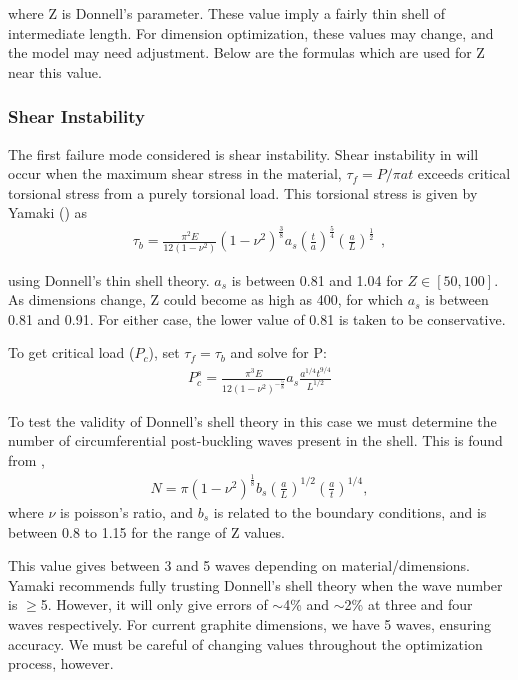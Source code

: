 \documentclass{report}
\begin{document}
where Z is Donnell's parameter. These value imply a fairly thin shell of intermediate length. For dimension optimization, these values may change, and the model may need adjustment. Below are the formulas which are used for Z near this value.

\subsubsection{Shear Instability}

The first failure mode considered is shear instability. Shear instability in will occur when the maximum shear stress in the material, $\tau_{f} = P/\pi at$ exceeds critical torsional stress from a purely torsional load. This torsional stress is given by Yamaki (\cite{Yamaki1984}) as
\begin{eqnarray}
\tau_{b} = \frac{\pi^2E}{12(1-\nu^2)}(1-\nu^2)^{\frac{3}{8}}a_s\left(\frac{t}{a}\right)^{\frac{5}{4}}\left(\frac{a}{L}\right)^{\frac{1}{2}}~~,
\end{eqnarray}

using Donnell's thin shell theory. $a_{s}$ is between 0.81 and 1.04 for $Z \in [50,100]$. As dimensions change, Z could become as high as 400, for which $a_{s}$ is between 0.81 and 0.91. For either case, the lower value of 0.81 is taken to be conservative.

To get critical load ($P_{c}$), set $\tau_{f} = \tau_{b}$ and solve for P:
\begin{eqnarray}
P_{c}^{s} = \frac{\pi^3E}{12(1-\nu^2)^{-\frac{5}{8}}}a_{s}\frac{a^{1/4}t^{9/4}}{L^{1/2}}
\end{eqnarray}

To test the validity of Donnell's shell theory in this case we must determine the number of circumferential post-buckling waves present in the shell. This is found from \cite{Yamaki1984},
\begin{eqnarray}
N = \pi(1-\nu^2)^{\frac{1}{8}}b_{s}\left(\frac{a}{L}\right)^{1/2}\left(\frac{a}{t}\right)^{1/4},
\end{eqnarray}
where $\nu$ is poisson's ratio, and $b_{s}$ is related to the boundary conditions, and is between 0.8 to 1.15 for the range of Z values.

This value gives between 3 and 5 waves depending on material/dimensions. Yamaki recommends fully trusting Donnell's shell theory when the wave number is $\geq$5. However, it will only give errors of $\sim$4\% and $\sim$2\% at three and four waves respectively. For current graphite dimensions, we have 5 waves, ensuring accuracy. We must be careful of changing values throughout the optimization process, however.
\end{document}
